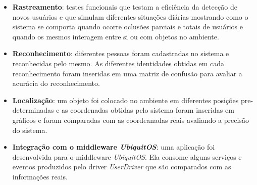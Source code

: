 	\begin{itemize}
		\item \textbf{Rastreamento}: testes funcionais que testam a eficiência da detecção de novos usuários e que simulam diferentes situações diárias mostrando como o sistema se comporta quando ocorre oclusões parciais e totais de usuários e quando os mesmos interagem entre si ou com objetos no ambiente.

		\item \textbf{Reconhecimento}: diferentes pessoas foram cadastradas no sistema e reconhecidas pelo mesmo. As diferentes identidades obtidas em cada reconhecimento foram inseridas em uma matriz de confusão para avaliar a acurácia do reconhecimento.

		\item \textbf{Localização}: um objeto foi colocado no ambiente em diferentes posições pre-determinadas e as coordenadas obtidas pelo sistema foram inseridas em gráficos e foram comparadas com as coordeanadas reais avaliando a precisão do sistema.

		\item \textbf{Integração com o middleware \textit{UbiquitOS}}: uma aplicação foi desenvolvida para o middleware \textit{UbiquitOS}. Ela consome alguns serviços e eventos produzidos pelo driver \textit{UserDriver} que são comparados com as informações reais.
	\end{itemize}



















